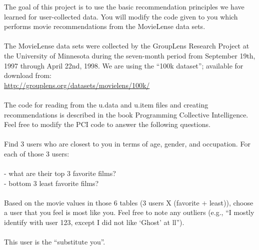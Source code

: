 The goal of this project is to use the basic recommendation principles
we have learned for user-collected data. You will modify the code
given to you which performs movie recommendations from the MovieLense
data sets.\\
\\
The MovieLense data sets were collected by the GroupLens Research
Project at the University of Minnesota during the seven-month period
from September 19th, 1997 through April 22nd, 1998.  We are using the
\enquote{100k dataset}; available for download from:\\
\url{http://grouplens.org/datasets/movielens/100k/
}\\
\\
The code for reading from the u.data and u.item files and creating
recommendations is described in the book Programming Collective
Intelligence.  Feel free to modify the PCI code to answer the 
following questions.\\
\\
Find 3 users who are closest to you in terms of age, 
gender, and occupation.  For each of those 3 users:\\
\\
- what are their top 3 favorite films?\\
- bottom 3 least favorite films?\\
\\
Based on the movie values in those 6 tables (3 users X (favorite $+$
least)), choose a user that you feel is most like you.  Feel 
free to note any outliers (e.g., \enquote{I mostly identify with user 123,
except I did not like \enquote{Ghost} at ll}).  \\
\\
This user is the \enquote{substitute you}.  